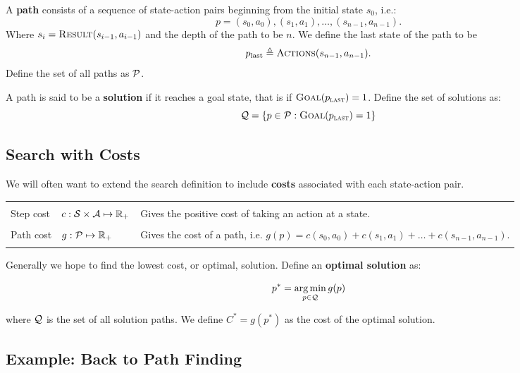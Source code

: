 \documentclass[11pt]{article}
\begin{document}
\begin{defn}
   A \textbf{path}
consists of a sequence of state-action pairs beginning from the initial state $s_0$, i.e.:  \[p = (s_0, a_0), (s_1, a_1), \ldots, (s_{n-1}, a_{n-1}).\] 
\noindent Where $s_i = \mathrm{\textsc{Result}}(s_{i-1}, a_{i-1})$ and the depth of the path to be $n$. We define the last state of the path to be  
 \[p_{\mathrm{last}} \triangleq \mathrm{\textsc{Actions}}(s_{n-1}, a_{n-1}).\] 
Define the set of all paths as $\mathcal{P}$.

\end{defn}

\begin{defn}
  A path is said to be a \textbf{solution} if it reaches a goal state, that is if $\mathrm{\textsc{Goal}}(p_{\mathrm{\textsc{last}}}) = 1$.
  Define the set of solutions as: 
  \[\mathcal{Q} = \{p \in \mathcal{P}:  \mathrm{\textsc{Goal}}(p_{\mathrm{\textsc{last}}}) = 1 \} \]
\end{defn}


\subsection{Search with Costs}

We will often want to extend the search definition to include \textbf{costs} associated with each state-action pair. 

\air

\begin{center}
\begin{tabularx}{\linewidth}{llX}
  \toprule
  \\
 Step cost & $c:\mathcal{S} \times \mathcal{A} \mapsto \mathbb{R}_+$ & Gives the positive cost of taking an action at a state. \\\\
 Path cost & $g:\mathcal{P}  \mapsto \mathbb{R}_+$ & Gives the cost of a path, i.e. $g(p) = c(s_0, a_0) +
c(s_1, a_1) + \ldots + c(s_{n-1}, a_{n-1})$. \\\\
\bottomrule
\end{tabularx}
\end{center}

\noindent Generally we hope to find the lowest cost, or optimal, solution. Define an \textbf{optimal solution} as:

\[ p^* = \argmin_{p \in \mcQ} g(p) \] 

\noindent where $\mathcal{Q}$ is the set of all solution paths. We define $C^* = g(p^*)$ as the cost of the optimal solution. 

\subsection{Example: Back to Path Finding}
\end{document}
